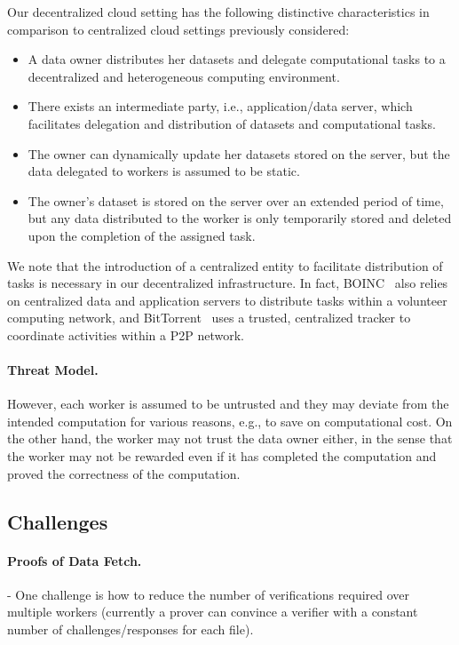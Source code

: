 Our decentralized cloud setting has the following distinctive characteristics in comparison to centralized cloud settings previously considered:
\begin{itemize}
 \item A data owner distributes her datasets and delegate computational tasks to a decentralized and heterogeneous computing environment.
 \item There exists an intermediate party, i.e., application/data server, which facilitates delegation and distribution of datasets and computational tasks.
 \item The owner can dynamically update her datasets stored on the server, but the data delegated to workers is assumed to be static.
 \item The owner's dataset is stored on the server over an extended period of time, but any data distributed to the worker is only temporarily stored and deleted upon the completion of the assigned task.
\end{itemize}

We note that the introduction of a centralized entity to facilitate distribution of tasks is necessary in our decentralized infrastructure.
In fact, BOINC~\cite{And04} also relies on centralized data and application servers to distribute tasks within a volunteer computing network, and BitTorrent~\cite{Coh03} uses a trusted, centralized tracker to coordinate activities within a P2P network.

\paragraph{Threat Model.}
However, each worker is assumed to be untrusted and they may deviate from the intended computation for various reasons, e.g., to save on computational cost. 
On the other hand, the worker may not trust the data owner either, in the sense that the worker may not be rewarded even if it has completed the computation and proved the correctness of the computation.


\subsection{Challenges} \label{sect:challenges}

\paragraph{Proofs of Data Fetch.}
- One challenge is how to reduce the number of verifications required over multiple workers (currently a prover can convince a verifier with a constant number of challenges/responses for each file). 

